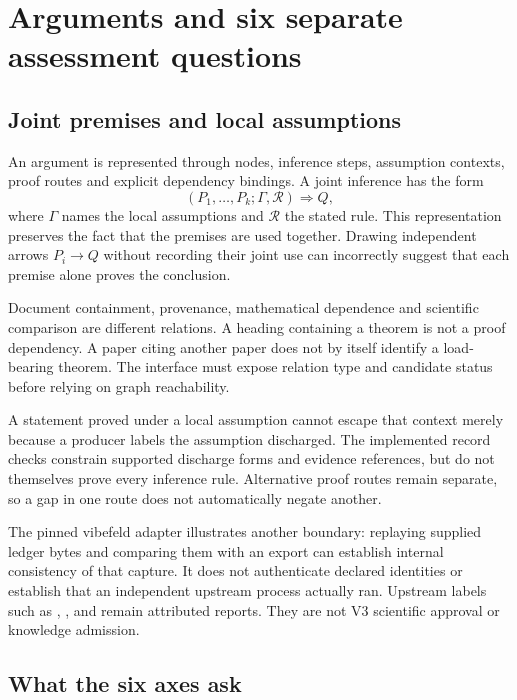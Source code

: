 \section{Arguments and six separate assessment questions}\label{sec:assessment}

\subsection{Joint premises and local assumptions}

An argument is represented through nodes, inference steps, assumption contexts, proof routes and explicit dependency bindings. A joint inference has the form
\begin{equation}
  (P_1,\ldots,P_k;\Gamma,\mathcal{R})\Longrightarrow Q,
\end{equation}
where $\Gamma$ names the local assumptions and $\mathcal{R}$ the stated rule. This representation preserves the fact that the premises are used together. Drawing independent arrows $P_i\to Q$ without recording their joint use can incorrectly suggest that each premise alone proves the conclusion.

 Document containment, provenance, mathematical dependence and scientific comparison are different relations. A heading containing a theorem is not a proof dependency. A paper citing another paper does not by itself identify a load-bearing theorem. The interface must expose relation type and candidate status before relying on graph reachability.

 A statement proved under a local assumption cannot escape that context merely because a producer labels the assumption discharged. The implemented record checks constrain supported discharge forms and evidence references, but do not themselves prove every inference rule. Alternative proof routes remain separate, so a gap in one route does not automatically negate another.

The pinned vibefeld adapter illustrates another boundary: replaying supplied ledger bytes and comparing them with an export can establish internal consistency of that capture. It does not authenticate declared identities or establish that an independent upstream process actually ran. Upstream labels such as , ,  and  remain attributed reports. They are not V3 scientific approval or knowledge admission.

\subsection{What the six axes ask}

